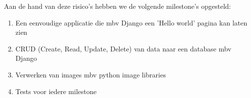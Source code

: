 Aan de hand van deze risico's hebben we de volgende milestone's opgesteld:
\begin{enumerate}
    \item Een eenvoudige applicatie die mbv Django een 'Hello world' pagina kan laten zien
    \item CRUD (Create, Read, Update, Delete) van data naar een database mbv Django
    \item Verwerken van images mbv python image libraries
    \item Tests voor iedere milestone
\end{enumerate}

